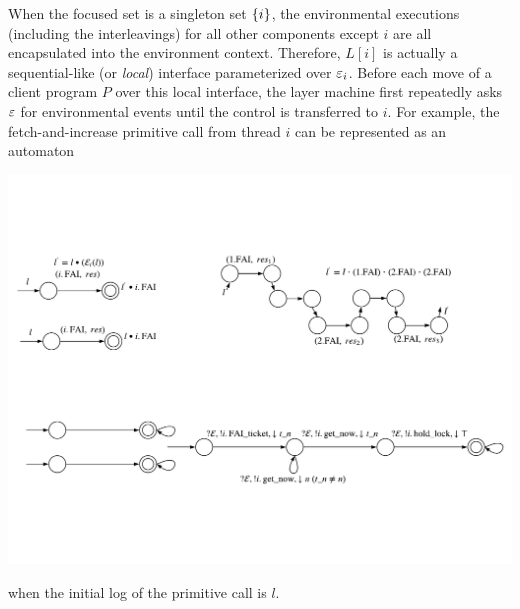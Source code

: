 When the focused set is a singleton set $\{i\}$,
the environmental executions (including the interleavings) for all other components except $i$ are all encapsulated into the environment
context.
Therefore,  $L[i]$ is actually a sequential-like (or \emph{local}) interface parameterized over $\oracle_i$. 
Before each move of a client program $P$ over this local interface, 
the layer machine first repeatedly asks $\oracle$ for environmental events until the control is transferred to $i$. 
For example, the fetch-and-increase primitive call from thread $i$ can be represented as an automaton 
\begin{center}
\includegraphics[scale=0.8]{figs/ccal/faiexamplewithcontext}
\end{center}
when the initial log of the primitive call is $l$. 

